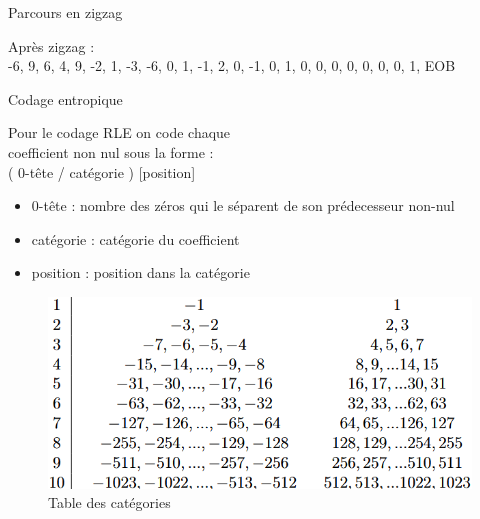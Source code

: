 \documentclass[xcolor=dvipsnames]{beamer}
\begin{document}
\begin{frame} {Parcours en zigzag}
\begin{minipage}{0.45\textwidth}
        \vspace{10pt} 

        \scriptsize
        \centering
        Après zigzag : \\ -6, 9, 6, 4, 9, -2, 1, -3, -6, 0, 1, -1, 2, 0, -1, 0, 1, 0, 0, 0, 0, 0, 0, 0, 1, EOB \\
    \end{minipage}


\end{frame}


\begin{frame} {Codage entropique}

    \hfill
    \begin{minipage}{0.5\textwidth}
        \scriptsize

        Pour le codage RLE on code chaque \\ coefficient non nul sous la forme :\\
        ( 0-tête / catégorie ) [position]
        \begin{itemize}
            \item 0-tête : nombre des zéros qui le séparent de son prédecesseur non-nul 
            \item catégorie : catégorie du coefficient
            \item position : position dans la catégorie
        \end{itemize}
    \end{minipage}
    \hfill
    \begin{minipage}{0.43\textwidth}
        \begin{figure}
            \centering
            \includegraphics[width=1\linewidth]{table_codage_entropique.png}
            \caption{Table des catégories}
        \end{figure}
    \end{minipage}
    \hfill

    \vspace{20pt} 
    

\end{frame}
\end{document}
